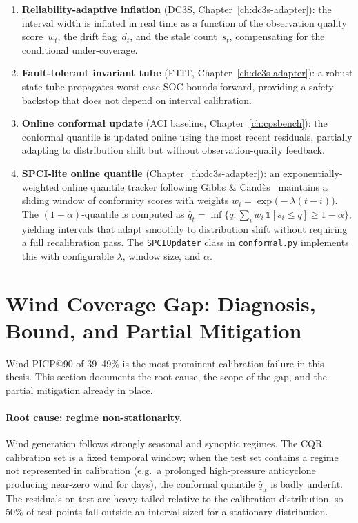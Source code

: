 \begin{enumerate}
  \item \textbf{Reliability-adaptive inflation} (DC3S, Chapter~\ref{ch:dc3s-adapter}):
    the interval width is inflated in real time as a function of the
    observation quality score~$w_t$, the drift flag~$d_t$, and the stale
    count~$s_t$, compensating for the conditional under-coverage.
  \item \textbf{Fault-tolerant invariant tube} (FTIT, Chapter~\ref{ch:dc3s-adapter}):
    a robust state tube propagates worst-case SOC bounds forward, providing
    a safety backstop that does not depend on interval calibration.
  \item \textbf{Online conformal update} (ACI baseline, Chapter~\ref{ch:cpsbench}):
    the conformal quantile is updated online using the most recent
    residuals, partially adapting to distribution shift but without
    observation-quality feedback.
  \item \textbf{SPCI-lite online quantile} (Chapter~\ref{ch:dc3s-adapter}):
    an exponentially-weighted online quantile tracker following
    Gibbs \& Candès~\cite{gibbs2021adaptive} maintains a sliding window
    of conformity scores with weights
    $w_i = \exp\!\bigl(-\lambda(t-i)\bigr)$.  The $(1-\alpha)$-quantile
    is computed as
    $\hat{q}_t = \inf\!\bigl\{q : \textstyle\sum_i w_i\,\mathbb{1}[s_i \le q]
    \ge 1-\alpha\bigr\}$,
    yielding intervals that adapt smoothly to distribution shift without
    requiring a full recalibration pass.  The {\texttt{SPCIUpdater}} class
    in {\texttt{conformal.py}} implements this with configurable
    $\lambda$, window size, and $\alpha$.
\end{enumerate}

\section{Wind Coverage Gap: Diagnosis, Bound, and Partial Mitigation}
\label{sec:wind-gap}

Wind PICP@90 of 39--49\% is the most prominent calibration failure in this
thesis.  This section documents the root cause, the scope of the gap, and
the partial mitigation already in place.

\paragraph{Root cause: regime non-stationarity.}
Wind generation follows strongly seasonal and synoptic regimes.  The CQR
calibration set is a fixed temporal window; when the test set contains a
regime not represented in calibration (e.g.\ a prolonged high-pressure
anticyclone producing near-zero wind for days), the conformal quantile
$\hat{q}_\alpha$ is badly underfit.  The residuals on test are heavy-tailed
relative to the calibration distribution, so 50\% of test points fall
outside an interval sized for a stationary distribution.

